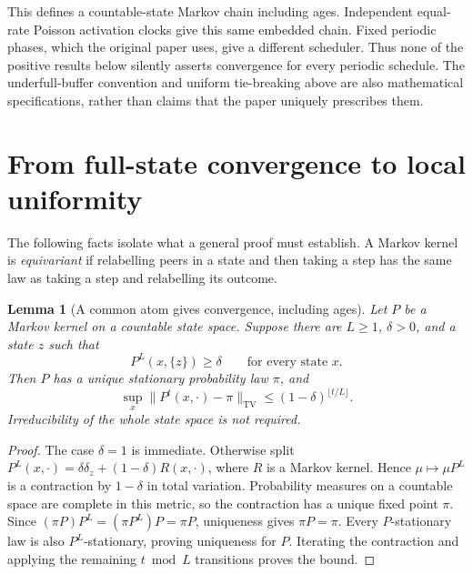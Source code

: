 \documentclass[11pt]{article}
\newtheorem{lemma}[theorem]{Lemma}
\newcommand{\TV}{\mathrm{TV}}
\begin{document}
This defines a countable-state Markov chain including ages.
Independent equal-rate Poisson activation clocks give this same
embedded chain. Fixed periodic phases, which the original paper
uses, give a different scheduler. Thus none of the positive results
below silently asserts convergence for every periodic schedule.
The underfull-buffer convention and uniform tie-breaking above are
also mathematical specifications, rather than claims that the paper
uniquely prescribes them.

\section{From full-state convergence to local uniformity}
\label{sec:stationary}

The following facts isolate what a general proof must establish.
A Markov kernel is \emph{equivariant} if relabelling peers in a state
and then taking a step has the same law as taking a step and
relabelling its outcome.

\begin{lemma}[A common atom gives convergence, including ages]
\label{lem:atom}
Let $P$ be a Markov kernel on a countable state space. Suppose there
are $L\ge1$, $\delta>0$, and a state $z$ such that
\[
 P^L(x,\{z\})\ge\delta\qquad\text{for every state }x.
\]
Then $P$ has a unique stationary probability law $\pi$, and
\[
 \sup_x\|P^t(x,\cdot)-\pi\|_{\TV}
 \le(1-\delta)^{\lfloor t/L\rfloor}.
\]
Irreducibility of the whole state space is not required.
\end{lemma}
\begin{proof}
The case $\delta=1$ is immediate. Otherwise split
$P^L(x,\cdot)=\delta\delta_z+(1-\delta)R(x,\cdot)$, where $R$ is a
Markov kernel. Hence $\mu\mapsto\mu P^L$ is a contraction by
$1-\delta$ in total variation. Probability measures on a countable
space are complete in this metric, so the contraction has a unique
fixed point $\pi$. Since
$(\pi P)P^L=(\pi P^L)P=\pi P$, uniqueness gives $\pi P=\pi$.
Every $P$-stationary law is also $P^L$-stationary, proving uniqueness
for $P$. Iterating the contraction and applying the remaining
$t\bmod L$ transitions proves the bound.
\end{proof}
\end{document}
